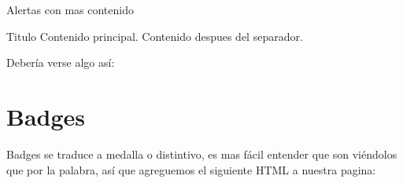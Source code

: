 \documentclass[letterpaper,10pt,spanish]{sphinxmanual}
\begin{document}
\begin{sphinxVerbatim}[commandchars=\\\{\}]
Alertas con mas contenido

  
   Titulo
  Contenido principal.
   Contenido despues del separador.
\end{sphinxVerbatim}

Debería verse algo así:

\begin{figure}[htbp]
\centering

\noindent{}
\end{figure}


\section{Badges}
\label{\detokenize{reusando-estilo-de-otros:badges}}
Badges se traduce a medalla o distintivo, es mas fácil entender que son
viéndolos que por la palabra, así que agreguemos el siguiente HTML a nuestra
pagina:
\end{document}
